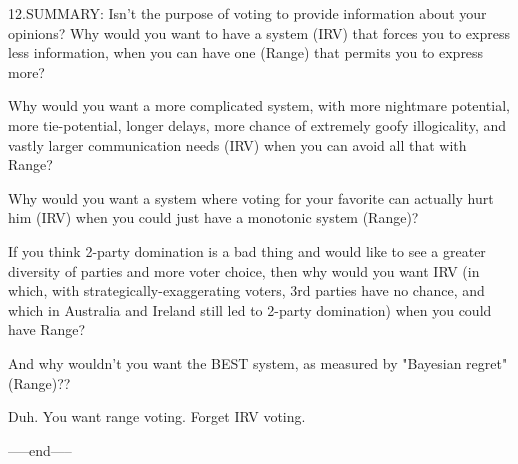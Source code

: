12.SUMMARY:
Isn't the purpose of voting to provide information about your opinions?
Why would you want to have a system (IRV) that forces you to express less information,
when you can have one (Range) that permits you to express more?

Why would you want a more complicated system, with more nightmare potential, more
tie-potential, longer delays, more chance of extremely goofy illogicality,
and vastly larger communication needs (IRV) when you 
can avoid all that with Range?

Why would you want a system where voting for your favorite can actually hurt him (IRV) when
you could just have a monotonic system (Range)?

If you think 2-party domination is a bad thing and would like to see a greater
diversity of parties and more voter choice,  then why would you want IRV (in which, with 
strategically-exaggerating voters, 3rd parties have no chance, and
which in Australia and Ireland still led to 2-party domination) when you could have Range?

And why wouldn't you want the BEST system, as measured by "Bayesian regret" (Range)??

Duh.  You want range voting.  Forget IRV voting.

-----end-----
